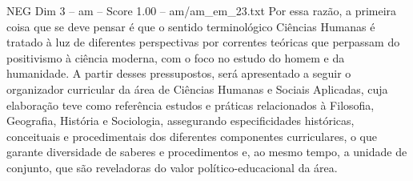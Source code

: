 \begin{textsample}{NEG Dim 3 – am – Score 1.00 – am/am\_em\_23.txt}
Por essa razão, a primeira coisa que se deve pensar é que o sentido terminológico Ciências Humanas é tratado à luz de diferentes perspectivas por correntes teóricas que perpassam do positivismo à ciência moderna, com o foco no estudo do homem e da humanidade.
A partir desses pressupostos, será apresentado a seguir o organizador curricular da área de Ciências Humanas e Sociais Aplicadas, cuja elaboração teve como referência estudos e práticas relacionados à Filosofia, Geografia, História e Sociologia, assegurando especificidades históricas, conceituais e procedimentais dos diferentes componentes curriculares, o que garante diversidade de saberes e procedimentos e, ao mesmo tempo, a unidade de conjunto, que são reveladoras do valor político-educacional da área.

\end{textsample}

